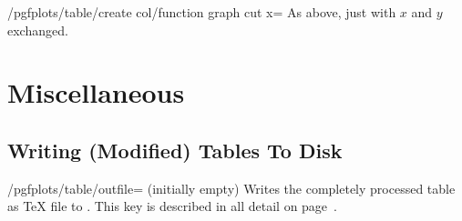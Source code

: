\begin{stylekey}{/pgfplots/table/create col/function graph cut x=}
    As above, just with $x$ and $y$ exchanged.
\end{stylekey}


\section[pgfplotstable-miscellaneous]{Miscellaneous}

\subsection{Writing (Modified) Tables To Disk}

\begin{key}{/pgfplots/table/outfile= (initially empty)}
    Writes the completely processed table as \TeX{} file to .
    This key is described in all detail on page~\pageref{page:outfile}.
\end{key}

